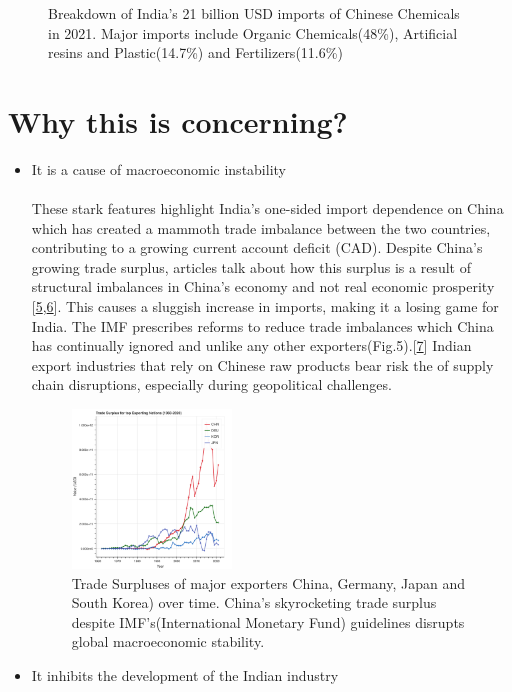 \documentclass{article}
\begin{document}
\begin{figure}[htp]
\begin{minipage}{.5\textwidth}
  \captionsetup{skip=0pt,font=small} %
    \caption{Breakdown of India's 21 billion USD imports of Chinese Chemicals in 2021. Major imports include Organic Chemicals(48\%), Artificial resins and Plastic(14.7\%) and Fertilizers(11.6\%)}
  \label{fig:test2}
\end{minipage}
\end{figure}


\section*{Why this is concerning?}
    \begin{itemize}[nosep , left=0pt , topsep=0pt]
        \item It is a cause of macroeconomic instability
            \paragraph{}
            These stark features highlight India’s one-sided import dependence on China which has created a mammoth trade imbalance between the two countries, contributing to a growing current account deficit (CAD). Despite China’s growing trade surplus, articles talk about how this surplus is a result of structural imbalances in China’s economy and not real economic prosperity [\hyperlink{link5}{5},\hyperlink{link6}{6}]. This causes a sluggish increase in imports, making it a losing game for India. The IMF prescribes reforms to reduce trade imbalances which China has continually ignored and unlike any other exporters(Fig.5).[\hyperlink{link7}{7}]
            Indian export industries that rely on Chinese raw products bear risk the of supply chain disruptions, especially during geopolitical challenges. 
            \begin{figure}[h]
                \centering
                \includegraphics[width=0.4\textwidth]{trade_surplus_graph.png} %
                  \captionsetup{skip=0pt,font=small} %
                    \caption{Trade Surpluses of major exporters China, Germany, Japan and South Korea) over time. China's skyrocketing trade surplus despite IMF's(International Monetary Fund) guidelines disrupts global macroeconomic stability.}
                \label{fig:example}
            \end{figure}
\bigskip            
        \item It inhibits the development of the Indian industry

\end{itemize}
\end{document}
